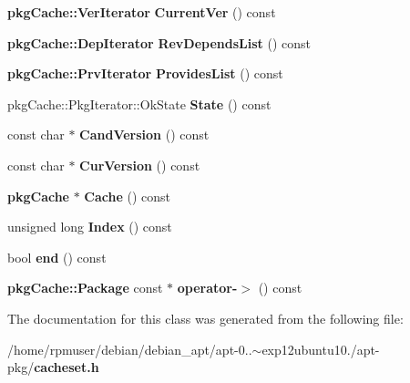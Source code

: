 \begin{DoxyCompactItemize}
\item 
{\bf pkg\-Cache\-::\-Ver\-Iterator} {\bfseries \-Current\-Ver} () const \label{classAPT_1_1PackageContainerInterface_1_1const__iterator_a291bbf4421942edc375a0b44620fb650}

\item 
{\bf pkg\-Cache\-::\-Dep\-Iterator} {\bfseries \-Rev\-Depends\-List} () const \label{classAPT_1_1PackageContainerInterface_1_1const__iterator_a1a77efd73f751005ca9a669ff57167dc}

\item 
{\bf pkg\-Cache\-::\-Prv\-Iterator} {\bfseries \-Provides\-List} () const \label{classAPT_1_1PackageContainerInterface_1_1const__iterator_ad301a5410f2dad0518ea8701941b0ef5}

\item 
pkg\-Cache\-::\-Pkg\-Iterator\-::\-Ok\-State {\bfseries \-State} () const \label{classAPT_1_1PackageContainerInterface_1_1const__iterator_ae2c4d8c0c44b34f459f4dbe6826ac06b}

\item 
const char $\ast$ {\bfseries \-Cand\-Version} () const \label{classAPT_1_1PackageContainerInterface_1_1const__iterator_acb819f6fbf70524de78c299f5d4ed1a9}

\item 
const char $\ast$ {\bfseries \-Cur\-Version} () const \label{classAPT_1_1PackageContainerInterface_1_1const__iterator_a2decffb67400b1e1aebb4b16a17abdb7}

\item 
{\bf pkg\-Cache} $\ast$ {\bfseries \-Cache} () const \label{classAPT_1_1PackageContainerInterface_1_1const__iterator_ae2cc99a8b0c3ed60e3f7343de27751f1}

\item 
unsigned long {\bfseries \-Index} () const \label{classAPT_1_1PackageContainerInterface_1_1const__iterator_ad92f189a9769780f1208e656e930db7b}

\item 
bool {\bfseries end} () const \label{classAPT_1_1PackageContainerInterface_1_1const__iterator_a71c36f24333cce752c1f32f032b7d6ba}

\item 
{\bf pkg\-Cache\-::\-Package} const $\ast$ {\bfseries operator-\/$>$} () const \label{classAPT_1_1PackageContainerInterface_1_1const__iterator_a866a1301c3a36790d12cc589f6f62911}

\end{DoxyCompactItemize}


\-The documentation for this class was generated from the following file\-:\begin{DoxyCompactItemize}
\item 
/home/rpmuser/debian/debian\-\_\-apt/apt-\/0..$\sim$exp12ubuntu10./apt-\/pkg/{\bf cacheset.\-h}\end{DoxyCompactItemize}
